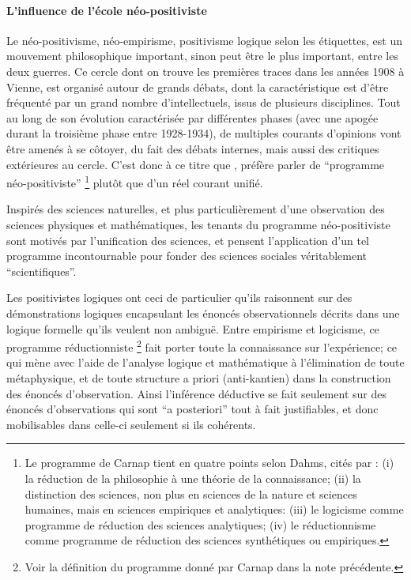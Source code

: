 
\paragraph{L'influence de l'école néo-positiviste}

Le néo-positivisme, néo-empirisme, positivisme logique selon les étiquettes, est un mouvement philosophique important, sinon peut être le plus important, entre les deux guerres. Ce cercle dont on trouve les premières traces dans les années 1908 à Vienne, est organisé autour de grands débats, dont la caractéristique est d'être fréquenté par un grand nombre d'intellectuels, issus de plusieurs disciplines. Tout au long de son évolution caractérisée par différentes phases (avec une apogée durant la troisième phase entre 1928-1934), de multiples courants d'opinions \textcite[126]{Ouelbani2006} vont être amenés à se côtoyer, du fait des débats internes, mais aussi des critiques extérieures au cercle. C'est donc à ce titre que \textcite[11]{Ouelbani2006}, préfère parler de \enquote{programme néo-positiviste} \footnote{Le programme de Carnap tient en quatre points selon Dahms, cités par \textcite{Ouelbani2006} : (i) la réduction de la philosophie à une théorie de la connaissance; (ii) la distinction des sciences, non plus en sciences de la nature et sciences humaines, mais en sciences empiriques et analytiques: (iii) le logicisme comme programme de réduction des sciences analytiques; (iv) le réductionnisme comme programme de réduction des sciences synthétiques ou empiriques.} plutôt que d'un réel courant unifié.

Inspirés des sciences naturelles, et plus particulièrement d'une observation des sciences physiques et mathématiques, les tenants du programme néo-positiviste sont motivés par l'unification des sciences, et pensent l'application d'un tel programme incontournable pour fonder des sciences sociales véritablement \enquote{scientifiques}. \textcite[1-20]{Ouelbani2006}

Les positivistes logiques ont ceci de particulier qu'ils raisonnent sur des démonstrations logiques encapsulant les énoncés observationnels décrits dans une logique formelle qu'ils veulent non ambiguë. Entre empirisme et logicisme, ce programme réductionniste \footnote{Voir la définition du programme donné par Carnap dans la note précédente.} fait porter toute la connaissance sur l'expérience; ce qui mène avec l'aide de l'analyse logique et mathématique à l'élimination de toute métaphysique, et de toute structure a priori (anti-kantien) dans la construction des énoncés d'observation. Ainsi l'inférence déductive se fait seulement sur des énoncés d'observations qui sont \foreignquote{latin}{a posteriori} tout à fait justifiables, et donc mobilisables dans celle-ci seulement si ils cohérents.

